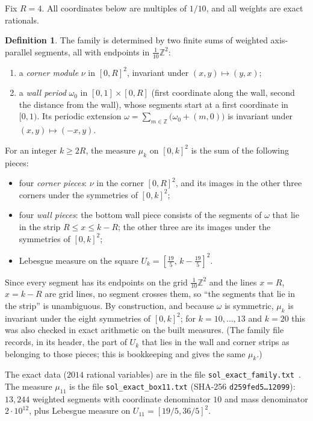 \documentclass[11pt]{amsart}
\theoremstyle{definition}
\newtheorem{definition}[theorem]{Definition}
\theoremstyle{remark}
\newcommand{\Z}{\mathbb Z}
\begin{document}
Fix $R=4$. All coordinates below are multiples of $1/10$, and all weights are exact rationals.

\begin{definition}\label{def:family}
The family is determined by two finite sums of weighted axis-parallel segments, all with endpoints in
$\frac1{10}\Z^2$:
\begin{enumerate}
\item a \emph{corner module} $\nu$ in $[0,R]^2$, invariant under $(x,y)\mapsto(y,x)$;
\item a \emph{wall period} $\omega_0$ in $[0,1]\times[0,R]$ (first coordinate along the wall, second the distance from
the wall), whose segments start at a first coordinate in $[0,1)$. Its periodic extension
$\omega=\sum_{m\in\Z}\bigl(\omega_0+(m,0)\bigr)$ is invariant under $(x,y)\mapsto(-x,y)$.
\end{enumerate}
For an integer $k\ge2R$, the measure $\mu_k$ on $[0,k]^2$ is the sum of the following pieces:
\begin{itemize}
\item four \emph{corner pieces}: $\nu$ in the corner $[0,R]^2$, and its images in the other three corners under the
symmetries of $[0,k]^2$;
\item four \emph{wall pieces}: the bottom wall piece consists of the segments of $\omega$ that lie in the strip
$R\le x\le k-R$; the other three are its images under the symmetries of $[0,k]^2$;
\item Lebesgue measure on the square $U_k=[\tfrac{19}5,\,k-\tfrac{19}5]^2$.
\end{itemize}
\end{definition}

Since every segment has its endpoints on the grid $\frac1{10}\Z^2$ and the lines $x=R$, $x=k-R$ are grid lines, no
segment crosses them, so ``the segments that lie in the strip'' is unambiguous. By construction, and because $\omega$
is symmetric, $\mu_k$ is invariant under the eight symmetries of $[0,k]^2$; for $k=10,\dots,13$ and $k=20$ this was
also checked in exact arithmetic on the built measures. (The family file records, in its header, the part of $U_k$
that lies in the wall and corner strips as belonging to those pieces; this is bookkeeping and gives the same
$\mu_k$.)

The exact data ($2014$ rational variables) are in the file \texttt{sol\_exact\_family.txt}~\cite{repo}. The measure
$\mu_{11}$ is the file \texttt{sol\_exact\_box11.txt} (SHA-256 \texttt{d259fed5\ldots 12099}): $13{,}244$ weighted
segments with coordinate denominator $10$ and mass denominator $2\cdot10^{12}$, plus Lebesgue measure on
$U_{11}=[19/5,36/5]^2$.
\end{document}
